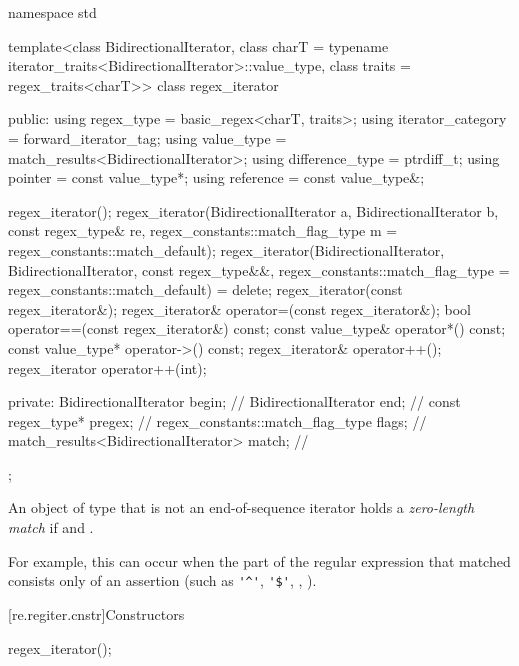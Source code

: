 \begin{codeblock}
namespace std {
  template<class BidirectionalIterator,
            class charT = typename iterator_traits<BidirectionalIterator>::value_type,
            class traits = regex_traits<charT>>
    class regex_iterator {
    public:
      using regex_type        = basic_regex<charT, traits>;
      using iterator_category = forward_iterator_tag;
      using value_type        = match_results<BidirectionalIterator>;
      using difference_type   = ptrdiff_t;
      using pointer           = const value_type*;
      using reference         = const value_type&;

      regex_iterator();
      regex_iterator(BidirectionalIterator a, BidirectionalIterator b,
                     const regex_type& re,
                     regex_constants::match_flag_type m = regex_constants::match_default);
      regex_iterator(BidirectionalIterator, BidirectionalIterator,
                     const regex_type&&,
                     regex_constants::match_flag_type = regex_constants::match_default) = delete;
      regex_iterator(const regex_iterator&);
      regex_iterator& operator=(const regex_iterator&);
      bool operator==(const regex_iterator&) const;
      const value_type& operator*() const;
      const value_type* operator->() const;
      regex_iterator& operator++();
      regex_iterator operator++(int);

    private:
      BidirectionalIterator                begin;               // \expos
      BidirectionalIterator                end;                 // \expos
      const regex_type*                    pregex;              // \expos
      regex_constants::match_flag_type     flags;               // \expos
      match_results<BidirectionalIterator> match;               // \expos
    };
}
\end{codeblock}

\pnum
An object of type  that is not an end-of-sequence iterator
holds a \textit{zero-length match} if  and
.
\begin{note}
For
example, this can occur when the part of the regular expression that
matched consists only of an assertion (such as \verb|'^'|, \verb|'$'|,
, ).
\end{note}

[re.regiter.cnstr]{Constructors}

%
\begin{itemdecl}
regex_iterator();
\end{itemdecl}

